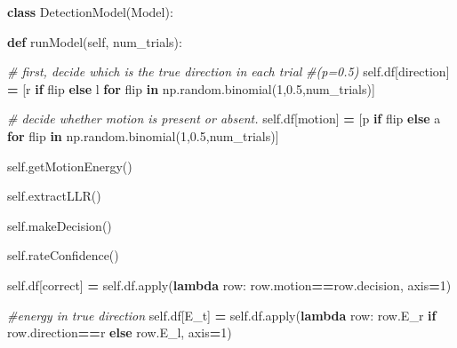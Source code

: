 \documentclass[12pt,twoside]{reedthesis}
\newenvironment{Shaded}{\begin{snugshade}}{\end{snugshade}}
\newcommand{\BuiltInTok}[1]{#1}
\newcommand{\CommentTok}[1]{\textcolor[rgb]{0.56,0.35,0.01}{\textit{#1}}}
\newcommand{\ControlFlowTok}[1]{\textcolor[rgb]{0.13,0.29,0.53}{\textbf{#1}}}
\newcommand{\DecValTok}[1]{\textcolor[rgb]{0.00,0.00,0.81}{#1}}
\newcommand{\FloatTok}[1]{\textcolor[rgb]{0.00,0.00,0.81}{#1}}
\newcommand{\KeywordTok}[1]{\textcolor[rgb]{0.13,0.29,0.53}{\textbf{#1}}}
\newcommand{\NormalTok}[1]{#1}
\newcommand{\OperatorTok}[1]{\textcolor[rgb]{0.81,0.36,0.00}{\textbf{#1}}}
\newcommand{\StringTok}[1]{\textcolor[rgb]{0.31,0.60,0.02}{#1}}
\newcommand{\VariableTok}[1]{\textcolor[rgb]{0.00,0.00,0.00}{#1}}
\begin{document}
\begin{Shaded}
\begin{Highlighting}[]
\KeywordTok{class}\NormalTok{ DetectionModel(Model):}
    
    \KeywordTok{def}\NormalTok{ runModel(}\VariableTok{self}\NormalTok{, num\_trials):}

        \CommentTok{\# first, decide which is the true direction in each trial }
        \CommentTok{\#(p=0.5)}
        \VariableTok{self}\NormalTok{.df[}\StringTok{\textquotesingle{}direction\textquotesingle{}}\NormalTok{] }\OperatorTok{=}\NormalTok{ [}\StringTok{\textquotesingle{}r\textquotesingle{}} \ControlFlowTok{if}\NormalTok{ flip }\ControlFlowTok{else} \StringTok{\textquotesingle{}l\textquotesingle{}} 
               \ControlFlowTok{for}\NormalTok{ flip }\KeywordTok{in}\NormalTok{ np.random.binomial(}\DecValTok{1}\NormalTok{,}\FloatTok{0.5}\NormalTok{,num\_trials)] }
        
        \CommentTok{\# decide whether motion is present or absent.}
        \VariableTok{self}\NormalTok{.df[}\StringTok{\textquotesingle{}motion\textquotesingle{}}\NormalTok{] }\OperatorTok{=}\NormalTok{ [}\StringTok{\textquotesingle{}p\textquotesingle{}} \ControlFlowTok{if}\NormalTok{ flip }\ControlFlowTok{else} \StringTok{\textquotesingle{}a\textquotesingle{}} 
               \ControlFlowTok{for}\NormalTok{ flip }\KeywordTok{in}\NormalTok{ np.random.binomial(}\DecValTok{1}\NormalTok{,}\FloatTok{0.5}\NormalTok{,num\_trials)] }
        
        \VariableTok{self}\NormalTok{.getMotionEnergy()}
        
        \VariableTok{self}\NormalTok{.extractLLR()}

        \VariableTok{self}\NormalTok{.makeDecision()}

        \VariableTok{self}\NormalTok{.rateConfidence()}
        
        \VariableTok{self}\NormalTok{.df[}\StringTok{\textquotesingle{}correct\textquotesingle{}}\NormalTok{] }\OperatorTok{=} \VariableTok{self}\NormalTok{.df.}\BuiltInTok{apply}\NormalTok{(}\KeywordTok{lambda}\NormalTok{ row: }
\NormalTok{               row.motion}\OperatorTok{==}\NormalTok{row.decision, }
\NormalTok{               axis}\OperatorTok{=}\DecValTok{1}\NormalTok{)}
        
         \CommentTok{\#energy in true direction}
        \VariableTok{self}\NormalTok{.df[}\StringTok{\textquotesingle{}E\_t\textquotesingle{}}\NormalTok{] }\OperatorTok{=} \VariableTok{self}\NormalTok{.df.}\BuiltInTok{apply}\NormalTok{(}\KeywordTok{lambda}\NormalTok{ row: }
\NormalTok{               row.E\_r }\ControlFlowTok{if}\NormalTok{ row.direction}\OperatorTok{==}\StringTok{\textquotesingle{}r\textquotesingle{}} 
               \ControlFlowTok{else}\NormalTok{ row.E\_l, }
\NormalTok{               axis}\OperatorTok{=}\DecValTok{1}\NormalTok{)}
        

\end{Highlighting}
\end{Shaded}
\end{document}
